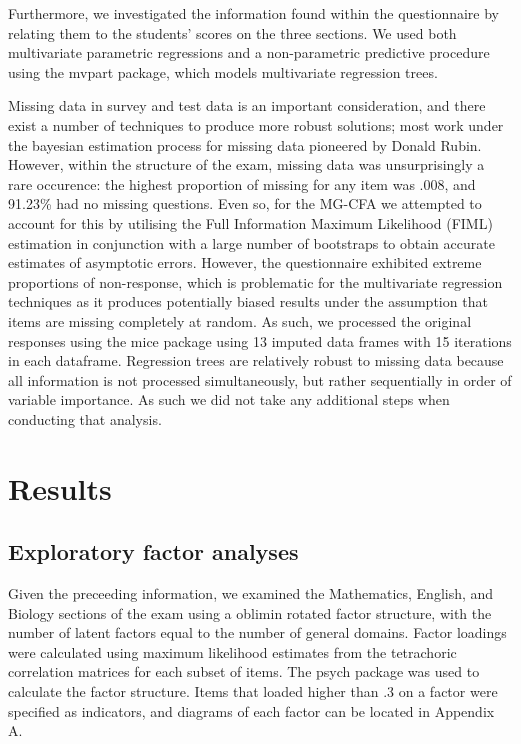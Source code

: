 \documentclass{article}\usepackage[]{graphicx}\usepackage[]{color}
\begin{document}
Furthermore, we investigated the information found within the questionnaire by relating them to the students' scores on the three sections. We used both multivariate parametric regressions and a non-parametric predictive procedure using the mvpart package, which models multivariate regression trees.

Missing data in survey and test data is an important consideration, and there exist a number of techniques to produce more robust solutions; most work under the bayesian estimation process for missing data pioneered by Donald Rubin\cite{rubin}. However, within the structure of the exam, missing data was unsurprisingly a rare occurence: the highest proportion of missing for any item was .008, and 91.23\% had no missing questions. Even so, for the MG-CFA we attempted to account for this by utilising the Full Information Maximum Likelihood (FIML) estimation in conjunction with a large number of bootstraps to obtain accurate estimates of asymptotic errors. However, the questionnaire exhibited extreme proportions of non-response, which is problematic for the multivariate regression techniques as it produces potentially biased results under the assumption that items are missing completely at random. As such, we processed the original responses using the mice package\cite{mice} using 13 imputed data frames with 15 iterations in each dataframe. Regression trees are relatively robust to missing data because all information is not processed simultaneously, but rather sequentially in order of variable importance. As such we did not take any additional steps when conducting that analysis.
\section{Results}
\subsection{Exploratory factor analyses}
Given the preceeding information, we examined the Mathematics, English, and Biology sections of the exam using a oblimin rotated factor structure, with the number of latent factors equal to the number of general domains. Factor loadings were calculated using maximum likelihood estimates from the tetrachoric correlation matrices for each subset of items. The psych package was used to calculate the factor structure. Items that loaded higher than .3 on a factor were specified as indicators, and diagrams of each factor can be located in Appendix A.
\end{document}
